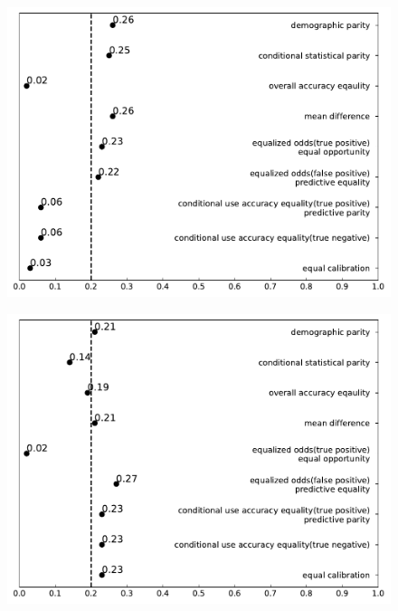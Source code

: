 \documentclass[conference]{IEEEtran}
\begin{document}
\begin{figure}[h]
    \centering
    \begin{minipage}[b]{0.48\linewidth}
        \centering
        \includegraphics[width=\linewidth]{Non-African-American}
        \label{fig:1}
    \end{minipage}
    \hfill
    \begin{minipage}[b]{0.48\linewidth}
        \centering
        \includegraphics[width=\linewidth]{Non-Asian}
        \label{fig:2}
    \end{minipage}
    \hfill
    \begin{minipage}[b]{0.48\linewidth}

\end{minipage}
\end{figure}
\end{document}
